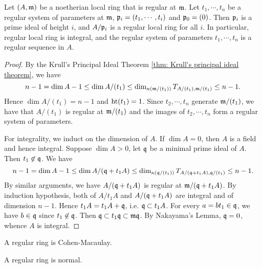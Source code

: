     \begin{proposition}\label{prop: regular system of parameters is a regular sequence}
        Let \((A,{\mathfrak{m}})\) be a noetherian local ring that is regular at \({\mathfrak{m}}\).
        Let \(t_1,\cdots,t_n\) be a regular system of parameters at \({\mathfrak{m}}\), \({\mathfrak{p}}_i = (t_1,\cdots,t_i)\) and \({\mathfrak{p}}_0 = (0)\).
        Then \({\mathfrak{p}}_i\) is a prime ideal of height \(i\), and \(A/{\mathfrak{p}}_i\) is a regular local ring for all \(i\).
        In particular, regular local ring is integral, and the regular system of parameters \(t_1,\cdots,t_n\) is a regular sequence in \(A\).
    \end{proposition}
    \begin{proof}
        By the Krull's Principal Ideal Theorem \ref{thm: Krull's principal ideal theorem}, we have 
        \[ n-1 = \dim A - 1 \leq \dim A/(t_1) \leq \dim_{{\kappa}({\mathfrak{m}}/(t_1))} T_{A/(t_1), {\mathfrak{m}}/(t_1)} \leq n-1.  \]
        Hence \(\dim A/(t_1) = n-1\) and \(\operatorname{ht} (t_1) = 1\).
        Since \(t_2,\cdots,t_n\) generate \({\mathfrak{m}}/(t_1)\), we have that \(A/(t_1)\) is regular at \({\mathfrak{m}}/(t_1)\) and the images of \(t_2,\cdots,t_n\) form a regular system of parameters.
    
        For integrality, we induct on the dimension of \(A\).
        If \(\dim A = 0\), then \(A\) is a field and hence integral.
        Suppose \(\dim A > 0\), let \({\mathfrak{q}}\) be a minimal prime ideal of \(A\).
        Then \(t_1 \not\in {\mathfrak{q}}\).
        We have 
        \[ n - 1 = \dim A - 1 \leq \dim A/({\mathfrak{q}} + t_1A) \leq \dim_{{\kappa}({\mathfrak{q}}/(t_1))} T_{A/({\mathfrak{q}} + t_1A), {\mathfrak{q}}/(t_1)} \leq n - 1. \]
        By similar arguments, we have \(A/({\mathfrak{q}} + t_1A)\) is regular at \({\mathfrak{m}}/({\mathfrak{q}} + t_1A)\).
        By induction hypothesis, both of \(A/t_1A\) and \(A/({\mathfrak{q}} + t_1A)\) are integral and of dimension \(n-1\).
        Hence \(t_1 A = t_1 A + {\mathfrak{q}}\), i.e. \({\mathfrak{q}} \subset t_1 A\).
        For every \(a = bt_1 \in {\mathfrak{q}}\), we have \(b \in {\mathfrak{q}}\) since \(t_1 \not\in {\mathfrak{q}}\).
        Then \({\mathfrak{q}} \subset t_1{\mathfrak{q}} \subset {\mathfrak{m}} {\mathfrak{q}}\).
        By Nakayama's Lemma, \({\mathfrak{q}} = 0\), whence \(A\) is integral. 
    \end{proof}

    \begin{corollary}\label{cor: regular ring is Cohen-Macaulay}
        A regular ring is Cohen-Macaulay.
    \end{corollary}

    \begin{corollary}
        A regular ring is normal.
    \end{corollary}


